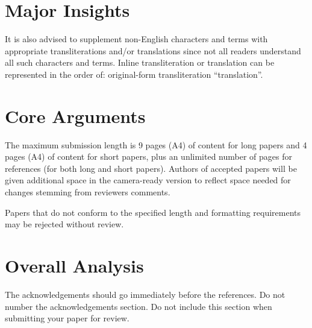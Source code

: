 \documentclass[11pt]{article}
\begin{document}
\section{Major Insights}

It is also advised to supplement non-English characters and terms
with appropriate transliterations and/or translations
since not all readers understand all such characters and terms.
Inline transliteration or translation can be represented in
the order of: original-form transliteration ``translation''.

\section{Core Arguments}
\label{sec:length}

The maximum submission length is 9 pages (A4) of content for long papers and 4 pages (A4) of content for short papers, 
plus an unlimited number of pages for
references (for both long and short papers). 
Authors of accepted papers will be given additional space in
the camera-ready version to reflect space needed for changes stemming
from reviewers comments.

Papers that do not
conform to the specified length and formatting requirements may be
rejected without review.

\iffalse
For papers accepted to the main conference, we will invite authors to provide a translation 
of the title and abstract and a 1-2 page synopsis of the paper in a second 
language of the authors' choice. Appropriate languages include but are not 
limited to authors' native languages, languages spoken in the authors' place 
of affiliation, and languages that are the focus of the research presented.
\fi

\section{Overall Analysis}

The acknowledgements should go immediately before the references.  Do
not number the acknowledgements section. Do not include this section
when submitting your paper for review.

% 
% 




\end{document}
